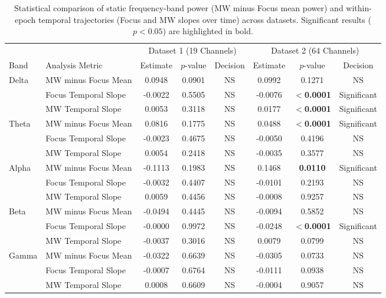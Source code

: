 \documentclass[conference]{IEEEtran}
\begin{document}
\begin{table}[t]
\centering
\caption{Statistical comparison of static frequency-band power (MW minus Focus mean power) and within-epoch temporal trajectories (Focus and MW slopes over time) across datasets. Significant results ($p < 0.05$) are highlighted in bold.}
\label{tab:statistical_comparison}
\begin{tabular}{llccc|ccc}
\toprule
& & \multicolumn{3}{c|}{Dataset 1 (19 Channels)} & \multicolumn{3}{c}{Dataset 2 (64 Channels)} \\
Band & Analysis Metric & Estimate & $p$-value & Decision & Estimate & $p$-value & Decision \\
\midrule
\multirow{3}{*}{Delta}
& MW minus Focus Mean & 0.0948 & 0.0901 & NS & 0.0992 & 0.1271 & NS \\
& Focus Temporal Slope & -0.0022 & 0.5505 & NS & -0.0076 & \textbf{$<$0.0001} & Significant \\
& MW Temporal Slope & 0.0053 & 0.3118 & NS & 0.0177 & \textbf{$<$0.0001} & Significant \\
\midrule
\multirow{3}{*}{Theta}
& MW minus Focus Mean & 0.0816 & 0.1775 & NS & 0.0488 & \textbf{$<$0.0001} & Significant \\
& Focus Temporal Slope & -0.0023 & 0.4675 & NS & -0.0050 & 0.4196 & NS \\
& MW Temporal Slope & 0.0054 & 0.2418 & NS & -0.0035 & 0.3577 & NS \\
\midrule
\multirow{3}{*}{Alpha}
& MW minus Focus Mean & -0.1113 & 0.1983 & NS & 0.1468 & \textbf{0.0110} & Significant \\
& Focus Temporal Slope & -0.0032 & 0.4407 & NS & -0.0101 & 0.2193 & NS \\
& MW Temporal Slope & 0.0059 & 0.4456 & NS & -0.0008 & 0.9257 & NS \\
\midrule
\multirow{3}{*}{Beta}
& MW minus Focus Mean & -0.0494 & 0.4445 & NS & -0.0094 & 0.5852 & NS \\
& Focus Temporal Slope & -0.0000 & 0.9972 & NS & -0.0248 & \textbf{$<$0.0001} & Significant \\
& MW Temporal Slope & -0.0037 & 0.3016 & NS & 0.0079 & 0.0799 & NS \\
\midrule
\multirow{3}{*}{Gamma}
& MW minus Focus Mean & -0.0322 & 0.6639 & NS & -0.0305 & 0.0733 & NS \\
& Focus Temporal Slope & -0.0007 & 0.6764 & NS & -0.0111 & 0.0938 & NS \\
& MW Temporal Slope & 0.0008 & 0.6609 & NS & -0.0004 & 0.9057 & NS \\
\bottomrule
\end{tabular}
\end{table}
\end{document}
